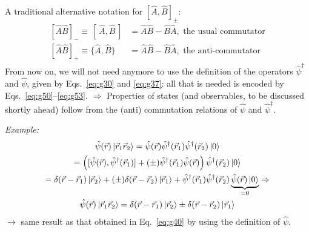 \documentclass[12pt]{article}
\newcommand{\be}{\begin{equation}}
\newcommand{\ee}{\end{equation}}
\begin{document}
\setcounter{equation}{54}
A traditional alternative notation for $[\hat{A},\hat{B}]_\pm$:
\be
\begin{aligned}
[\hat{A} \hat{B}]_- \equiv \, [ \,\hat{A}, \hat{B} \,]   &=\hat{A} \hat{B}-\hat{B} \hat{A}, \text{ the usual commutator}\\
[\hat{A} \hat{B}]_+ \equiv \{\hat{A}, \hat{B}\} &=\hat{A} \hat{B}-\hat{B} \hat{A}, \text{ the anti-commutator}
\end{aligned}
\ee
From now on, we will not need anymore to use
the definition of the operators $\hat{\psi}^{\dagger}$ and $\hat{\psi}$, given by
Eqs.~\eqref{eq:g30} and \eqref{eq:g37}: all that is needed is encoded
by Eqs.~\eqref{eq:g50}--\eqref{eq:g53}.
$\Rightarrow$
Properties of states (and observables, to
be discussed shortly ahead) follow from the
(anti) commutation relations of $\hat{\psi}$ and $\hat{\psi}^\dagger$.

\emph{Example:}
\be
\begin{gathered}
\hat{\psi}(\vec{r}) \ket{\vec{r}_1\vec{r}_2} = 
\hat{\psi}(\vec{r}) \hat{\psi}^\dagger(\vec{r}_1) \hat{\psi}^\dagger(\vec{r}_2) \ket{0}\\
= \left(
[\hat{\psi}(\vec{r}),\hat{\psi}^\dagger(\vec{r}_1)] + 
(\pm)\hat{\psi}^\dagger(\vec{r}_1)\hat{\psi}(\vec{r})
\right)\hat{\psi}^\dagger(\vec{r}_2) \ket{0}\\
= \delta(\vec{r}-\vec{r}_1)\ket{\vec{r}_2} + (\pm)\delta(\vec{r}-\vec{r}_2)\ket{\vec{r}_1}
+ \hat{\psi}^\dagger(\vec{r}_1)\hat{\psi}^\dagger(\vec{r}_2)\underbrace{\hat{\psi}(\vec{r})\ket{0}}_{=0} \Rightarrow\\
\hat{\psi}(\vec{r}) \ket{\vec{r}_1\vec{r}_2} = 
\delta(\vec{r}-\vec{r}_1)\ket{\vec{r}_2} \pm \delta(\vec{r}-\vec{r}_2)\ket{\vec{r}_1}
\end{gathered}
\ee
$\to$ same result as that obtained in Eq.~\eqref{eq:g40}
by using the definition of $\hat{\psi}$.
\end{document}
